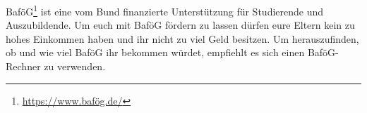BaföG\footnote{\url{https://www.bafög.de/}} ist eine vom Bund finanzierte Unterstützung für Studierende und Auszubildende. Um euch mit BaföG fördern zu lassen dürfen eure Eltern kein zu hohes Einkommen haben und ihr nicht zu viel Geld besitzen. Um herauszufinden, ob und wie viel BaföG ihr bekommen würdet, empfiehlt es sich einen BaföG-Rechner zu verwenden.
